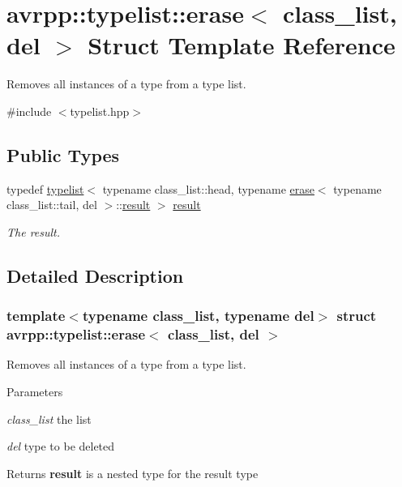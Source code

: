 \hypertarget{structavrpp_1_1typelist_1_1erase}{
\section{avrpp::typelist::erase$<$ class\_\-list, del $>$ Struct Template Reference}
\label{structavrpp_1_1typelist_1_1erase}
}


Removes all instances of a type from a type list.  




{\ttfamily \#include $<$typelist.hpp$>$}

\subsection*{Public Types}
\begin{DoxyCompactItemize}
\item 
typedef \hyperlink{structavrpp_1_1typelist_1_1typelist}{typelist}$<$ typename class\_\-list::head, typename \hyperlink{structavrpp_1_1typelist_1_1erase}{erase}$<$ typename class\_\-list::tail, del $>$::\hyperlink{structavrpp_1_1typelist_1_1typelist}{result} $>$ \hyperlink{structavrpp_1_1typelist_1_1erase_a5804c06bd9170bca96b41ef646e73852}{result}
\begin{DoxyCompactList}\small\item\em The result. \item\end{DoxyCompactList}\end{DoxyCompactItemize}


\subsection{Detailed Description}
\subsubsection*{template$<$typename class\_\-list, typename del$>$ struct avrpp::typelist::erase$<$ class\_\-list, del $>$}

Removes all instances of a type from a type list. 
\begin{DoxyParams}{Parameters}
\item[{\em class\_\-list}]the list \item[{\em del}]type to be deleted \end{DoxyParams}
\begin{DoxyReturn}{Returns}
{\bfseries result} is a nested type for the result type 
\end{DoxyReturn}


